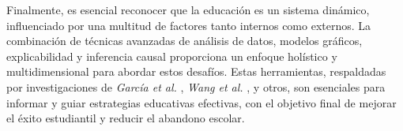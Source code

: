 Finalmente, es esencial reconocer que la educación es un sistema dinámico, influenciado por una multitud de factores tanto internos como externos. La combinación de técnicas avanzadas de análisis de datos, modelos gráficos, explicabilidad y inferencia causal proporciona un enfoque holístico y multidimensional para abordar estos desafíos. Estas herramientas, respaldadas por investigaciones de \textit{García et al.} \cite{garcia2018prediccion}, \textit{Wang et al.} \cite{wang2017literature}, y otros, son esenciales para informar y guiar estrategias educativas efectivas, con el objetivo final de mejorar el éxito estudiantil y reducir el abandono escolar.